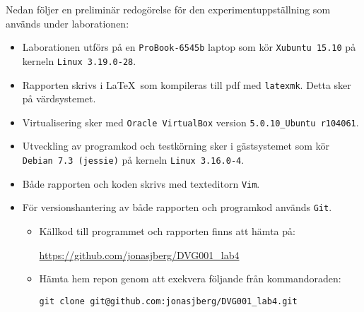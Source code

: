Nedan följer en preliminär redogörelse för den experimentuppställning som används
under laborationen:

\begin{itemize}
  \item Laborationen utförs på en \texttt{ProBook-6545b} laptop som kör
        \texttt{Xubuntu 15.10} på kerneln \texttt{Linux 3.19.0-28}.

  \item Rapporten skrivs i \LaTeX\  som kompileras till pdf med \texttt{latexmk}.
        Detta sker på värdsystemet.

  \item Virtualisering sker med \texttt{Oracle VirtualBox} version
        \texttt{5.0.10\_Ubuntu r104061}.

  \item Utveckling av programkod och testkörning sker i gästsystemet som kör
        \texttt{Debian 7.3 (jessie)} på kerneln \texttt{Linux 3.16.0-4}.

  \item Både rapporten och koden skrivs med texteditorn \texttt{Vim}.

  \item För versionshantering av både rapporten och programkod används \texttt{Git}.
    \begin{itemize}
      \item Källkod till programmet och rapporten finns att hämta på:

            \url{https://github.com/jonasjberg/DVG001\_lab4}

      \item Hämta hem repon genom att exekvera följande från kommandoraden:
            
            \texttt{git clone git@github.com:jonasjberg/DVG001\_lab4.git}

    \end{itemize}
\end{itemize}


